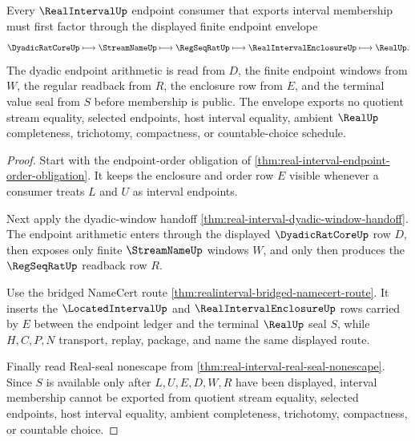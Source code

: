 \begin{theorem}
\label{thm:realinterval-finite-endpoint-envelope-route}
Every $\RealIntervalUp$ endpoint consumer that exports interval membership must
first factor through the displayed finite endpoint envelope
$$
\DyadicRatCoreUp \longmapsto \StreamNameUp \longmapsto
\RegSeqRatUp \longmapsto \RealIntervalEnclosureUp \longmapsto \RealUp .
$$
The dyadic endpoint arithmetic is read from $D$, the finite endpoint windows
from $W$, the regular readback from $R$, the enclosure row from $E$, and the
terminal value seal from $S$ before membership is public. The envelope exports
no quotient stream equality, selected endpoints, host interval equality,
ambient $\RealUp$ completeness, trichotomy, compactness, or countable-choice
schedule.
\end{theorem}
\begin{proof}
Start with the endpoint-order obligation of
\autoref{thm:real-interval-endpoint-order-obligation}. It keeps the enclosure
and order row $E$ visible whenever a consumer treats $L$ and $U$ as interval
endpoints.

Next apply the dyadic-window handoff
\autoref{thm:real-interval-dyadic-window-handoff}. The endpoint arithmetic
enters through the displayed $\DyadicRatCoreUp$ row $D$, then exposes only
finite $\StreamNameUp$ windows $W$, and only then produces the $\RegSeqRatUp$
readback row $R$.

Use the bridged NameCert route
\autoref{thm:realinterval-bridged-namecert-route}. It inserts the
$\LocatedIntervalUp$ and $\RealIntervalEnclosureUp$ rows carried by $E$ between
the endpoint ledger and the terminal $\RealUp$ seal $S$, while $H,C,P,N$
transport, replay, package, and name the same displayed route.

Finally read Real-seal nonescape from
\autoref{thm:real-interval-real-seal-nonescape}. Since $S$ is available only
after $L,U,E,D,W,R$ have been displayed, interval membership cannot be exported
from quotient stream equality, selected endpoints, host interval equality,
ambient completeness, trichotomy, compactness, or countable choice.
\end{proof}


